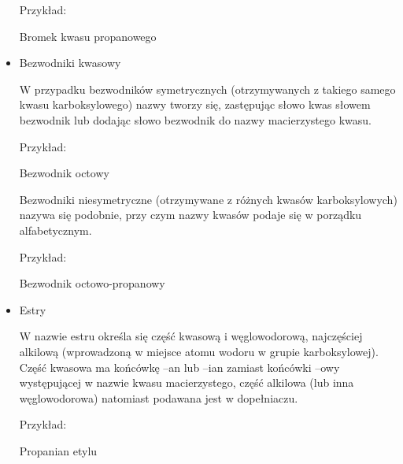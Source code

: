 \begin{itemize}
    \begin{center}
        Przykład:
    
        
        Bromek kwasu propanowego
    \end{center}

    \item Bezwodniki kwasowy
    

    W przypadku bezwodników symetrycznych (otrzymywanych z takiego samego kwasu karboksylowego) nazwy tworzy się, zastępując słowo kwas słowem bezwodnik lub dodając słowo bezwodnik do nazwy macierzystego kwasu.

    \begin{center}
        Przykład:
    
        
        Bezwodnik octowy
    \end{center}

    Bezwodniki niesymetryczne (otrzymywane z różnych kwasów karboksylowych) nazywa się podobnie, przy czym nazwy kwasów podaje się w porządku alfabetycznym.

    \begin{center}
        Przykład:
    
        
        Bezwodnik octowo-propanowy
    \end{center}
    \newpage
    \item Estry
    

    W nazwie estru określa się część kwasową i węglowodorową, najczęściej alkilową (wprowadzoną w miejsce atomu wodoru w grupie karboksylowej). Część kwasowa ma końcówkę –an lub –ian zamiast końcówki –owy występującej w nazwie kwasu macierzystego, część alkilowa (lub inna węglowodorowa) natomiast podawana jest w dopełniaczu.

    \begin{center}
        Przykład:
    
        
        Propanian etylu
    \end{center}


\end{itemize}
